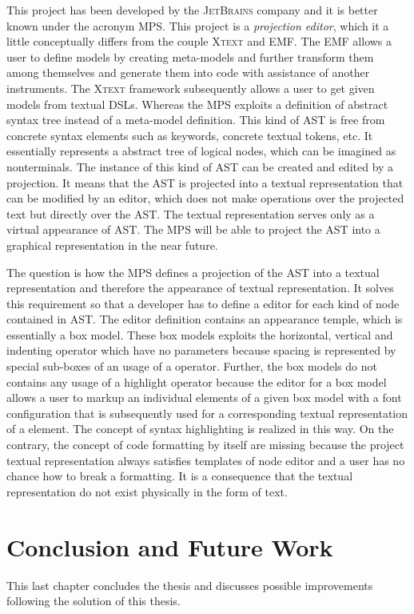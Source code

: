 \documentclass[12pt,notitlepage,a4paper]{report}
\begin{document}
This project \cite{MPS} has been developed by the \textsc{JetBrains} company and it is better known under the acronym MPS. This project is a \textit{projection editor}, which it a little conceptually differs from the couple \textsc{Xtext} and  EMF. The EMF allows a user to define models by creating meta-models and further transform them among themselves and generate them into code with assistance of another instruments. The \textsc{Xtext} framework subsequently allows a user to get given models from textual DSLs. Whereas the MPS exploits a definition of abstract syntax tree instead of a meta-model definition. This kind of AST is free from concrete syntax elements such as keywords, concrete textual tokens, etc. It essentially represents a abstract tree of logical nodes, which can be imagined as nonterminals. The instance of this kind of AST can be created and edited by a projection. It means that the AST is projected into a textual representation that can be modified by an editor, which does not make operations over the projected text but directly over the AST. The textual representation serves only as a virtual appearance of AST. The MPS will be able to project the AST into a graphical representation in the near future.

The question is how the MPS defines a projection of the AST into a textual representation and therefore the appearance of textual representation. It solves this requirement so that a developer has to define a editor for each kind of node contained in AST. The editor definition contains an appearance temple, which is essentially a box model. These box models exploits the horizontal, vertical and indenting operator which have no parameters because spacing is represented by special sub-boxes of an usage of a operator.  Further, the box models do not contains any usage of a highlight operator because the editor for a box model allows a user to markup an individual elements of a given box model with a font configuration that is subsequently used for a corresponding textual representation of a element. The concept of syntax highlighting is realized in this way. On the contrary, the concept of code formatting by itself are missing because the project textual representation always satisfies templates of node editor and a user has no chance how to break a formatting. It is a consequence that the textual representation do not exist physically  in the form of text.




\chapter{Conclusion and Future Work}
This last chapter concludes the thesis and discusses possible improvements following  the solution of this thesis.
\end{document}
